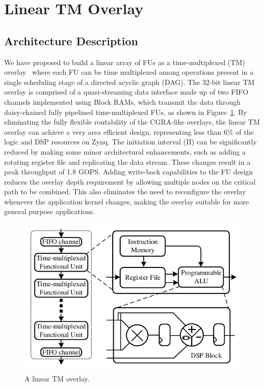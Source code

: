 \section{Linear TM Overlay}

\subsection{Architecture Description}
We have proposed to build a linear array of FUs as a time-multiplexed (TM) overlay~\cite{li2018time} where each FU can be time multiplexed among operations present in a single scheduling stage of a directed acyclic graph (DAG). 
The 32-bit linear TM overlay is comprised of a quasi-streaming data interface made up of two FIFO channels implemented using Block RAMs, which transmit the data through daisy-chained fully pipelined time-multiplexed FUs, as shown in Figure~\ref{overlay}. 
By eliminating the fully flexible routability of the CGRA-like overlays, the linear TM overlay can achieve a very area efficient design, representing less than 6\% of the logic and DSP resources on Zynq. 
The initiation interval (II) can be significantly reduced by making some minor architectural enhancements, such as adding a rotating register file and replicating the data stream. These changes result in a peak throughput of 1.8 GOPS. 
Adding write-back capabilities to the FU design reduces the overlay depth requirement by allowing multiple nodes on the critical path to be combined. This also eliminates the need to reconfigure the overlay whenever the application kernel changes, making the overlay suitable for more general purpose applications. 


\begin{figure}
    \centering
	\includegraphics[width=\columnwidth]{Figures/overlay.pdf}
	\caption{A linear TM overlay.}
	\label{overlay}
\end{figure}



